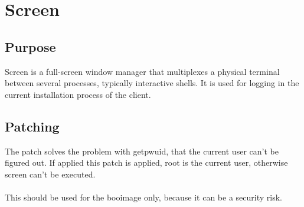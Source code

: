 \section{Screen}
\subsection{Purpose}
Screen is a full-screen window manager that multiplexes a physical terminal between several processes, typically interactive shells. It is used for logging in the current installation process of the client.

\subsection{Patching}
The patch solves the problem with getpwuid, that the current user can't be figured out. If applied this patch is applied, root is the current user, otherwise screen can't be executed.\\\\
This should be used for the booimage only, because it can be a security risk.

